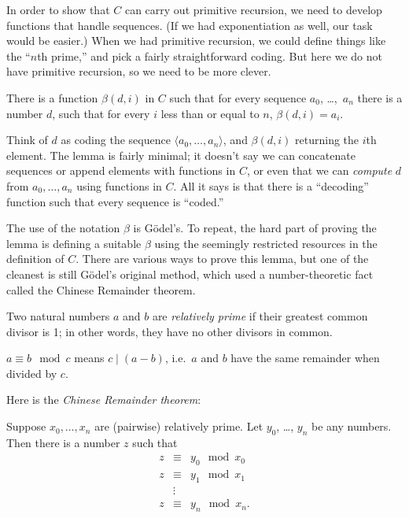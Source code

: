 \documentclass[../../include/open-logic-section]{subfiles}
\begin{document}


In order to show that $C$ can carry out primitive recursion, we need
to develop functions that handle sequences. (If we had exponentiation
as well, our task would be easier.) When we had primitive recursion,
we could define things like the ``$n$th prime,'' and pick a fairly
straightforward coding. But here we do not have primitive recursion,
so we need to be more clever.

\begin{lem}
There is a function $\beta(d,i)$ in $C$ such that for every sequence
$a_0$, \dots,~$a_n$ there is a number $d$, such that for every $i$ less
than or equal to $n$, $\beta(d,i) = a_i$.
\end{lem}

Think of $d$ as coding the sequence $\langle a_0,\dots,a_n \rangle$, and
$\beta(d,i)$ returning the $i$th element. The lemma is fairly minimal;
it doesn't say we can concatenate sequences or append elements with
functions in $C$, or even that we can \emph{compute} $d$ from
$a_0,\dots,a_n$ using functions in $C$. All it says is that there is
a ``decoding'' function such that every sequence is ``coded.''

The use of the notation $\beta$ is G\"odel's. To repeat, the hard part
of proving the lemma is defining a suitable $\beta$ using the
seemingly restricted resources in the definition of $C$. There are
various ways to prove this lemma, but one of the cleanest is still
G\"odel's original method, which used a number-theoretic fact called
the Chinese Remainder theorem.

\begin{defn}
  Two natural numbers $a$ and $b$ are \emph{relatively prime} if their
  greatest common divisor is 1; in other words, they have no other
  divisors in common.
\end{defn}

\begin{defn}
$a \equiv b \mod c$ means $c \mid (a-b)$, i.e.\ $a$ and $b$ have the
same remainder when divided by $c$.
\end{defn}

Here is the \emph{Chinese Remainder theorem}:
\begin{thm}
Suppose $x_0,\dots,x_n$ are (pairwise) relatively prime. Let
$y_0$, \dots, $y_n$ be any numbers. Then there is a number $z$ such that
\begin{eqnarray*}
z & \equiv & y_0 \mod x_0 \\
z & \equiv & y_1 \mod x_1 \\
& \vdots & \\
z & \equiv & y_n \mod x_n.
\end{eqnarray*}
\end{thm}
\end{document}
